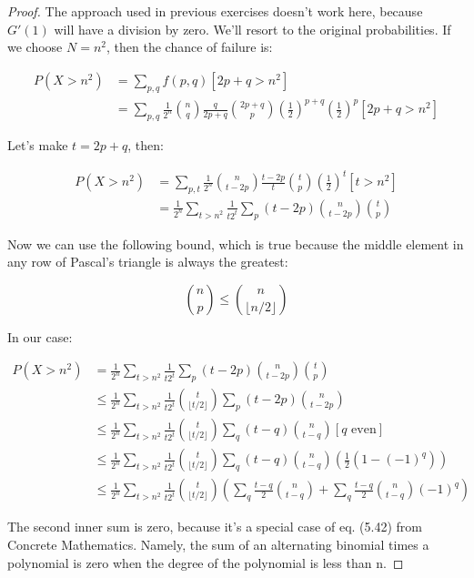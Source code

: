 \documentclass[10pt]{book}
\begin{document}
\begin{proof}

  The approach used in previous exercises doesn't work here, because $G'(1)$ will have a division by zero. We'll resort to the original probabilities. If we choose $N=n^2$, then the chance of failure is:

\begin{align*}
  P(X > n^2) &= \sum_{p,q} f(p,q) [2p+q > n^2] \\
      &= \sum_{p,q} \frac{1}{2^n}{n \choose q}\frac{q}{2p+q}
       {2p+q\choose p}
       \left(\frac{1}{2}\right)^{p+q}\left(\frac{1}{2}\right)^{p} [2p+q> n^2]
\end{align*}

Let's make $t=2p+q$, then:

\begin{align*}
  P(X > n^2)
    &= \sum_{p,t} \frac{1}{2^n}{n \choose t-2p}\frac{t-2p}{t}
       {t\choose p}
       \left(\frac{1}{2}\right)^{t} [t> n^2] \\
    &= \frac{1}{2^n}\sum_{t>n^2} \frac{1}{t2^t}\sum_p(t-2p){n \choose t-2p}
       {t\choose p}
\end{align*}

Now we can use the following bound, which is true because the middle element in any row of Pascal's triangle is always the greatest:

$${n\choose p}\le{n\choose\lfloor n/2\rfloor}$$

In our case:

\begin{align*}
  P(X > n^2) 
  &= \frac{1}{2^n}\sum_{t>n^2} \frac{1}{t2^t}\sum_p(t-2p){n \choose t-2p}
       {t\choose p} \\
  &\le \frac{1}{2^n}\sum_{t>n^2} \frac{1}{t2^t}{t\choose\lfloor t/2\rfloor}
       \sum_p(t-2p){n \choose t-2p}\\
  &\le \frac{1}{2^n}\sum_{t>n^2} \frac{1}{t2^t}{t\choose\lfloor t/2\rfloor}
       \sum_q(t-q){n \choose t-q}[q\text{ even}]\\
  &\le \frac{1}{2^n}\sum_{t>n^2} \frac{1}{t2^t}{t\choose\lfloor t/2\rfloor}
       \sum_q(t-q){n \choose t-q}
       \left(\frac{1}{2}\left(1-(-1)^q\right)\right)\\
  &\le \frac{1}{2^n}\sum_{t>n^2} \frac{1}{t2^t}{t\choose\lfloor t/2\rfloor}
       \left(
         \sum_q\frac{t-q}{2}{n \choose t-q} + 
         \sum_q\frac{t-q}{2}{n \choose t-q}(-1)^q 
       \right)
\end{align*}

The second inner sum is zero, because it's a special case of eq. (5.42) from Concrete Mathematics. Namely, the sum of an alternating binomial times a polynomial is zero when the degree of the polynomial is less than n.


\end{proof}
\end{document}
